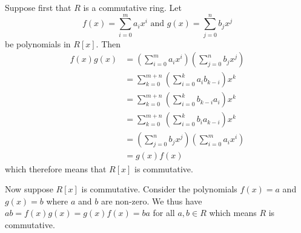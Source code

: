 \begin{questions}
\begin{partquestions}{\alph*}
        \item Suppose first that $R$ is a commutative ring. Let
        \[
            f(x) = \sum_{i=0}^ma_ix^i \text{ and } g(x) = \sum_{j=0}^nb_jx^j
        \]
        be polynomials in $R[x]$. Then
        \begin{align*}
            f(x)g(x) &= \left(\sum_{i=0}^ma_ix^i\right)\left(\sum_{j=0}^nb_jx^j\right)\\
            &= \sum_{k=0}^{m+n}\left(\sum_{i=0}^k a_{i}b_{k-i}\right)x^k\\
            &= \sum_{k=0}^{m+n}\left(\sum_{i=0}^k b_{k-i}a_{i}\right)x^k\\
            &= \sum_{k=0}^{m+n}\left(\sum_{i=0}^k b_{i}a_{k-i}\right)x^k\\
            &= \left(\sum_{j=0}^nb_jx^j\right)\left(\sum_{i=0}^ma_ix^i\right)\\
            &= g(x)f(x)
        \end{align*}
        which therefore means that $R[x]$ is commutative.

        Now suppose $R[x]$ is commutative. Consider the polynomials $f(x) = a$ and $g(x) = b$ where $a$ and $b$ are non-zero. We thus have $ab = f(x)g(x) = g(x)f(x) = ba$ for all $a,b \in R$ which means $R$ is commutative.
    \end{partquestions}
\end{questions}
